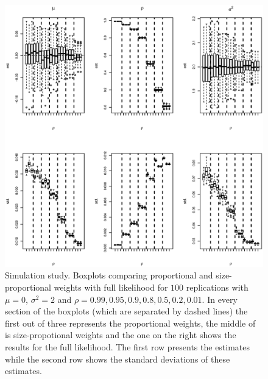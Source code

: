 \documentclass[11pt,a5paper,twoside]{book}
\begin{document}
{\begin{figure}[ht!]
\centering
\includegraphics[angle=270]{comp_rho.eps}
\caption[Simulation study. Boxplots comparing proportional and size-proportional weights with full likelihood for $100$ replications with $\mu=0$, $\sigma^2=2$ and $\rho=0.99,0.95,0.9,0.8,0.5,0.2,0.01$]{Simulation study. Boxplots comparing proportional and size-proportional weights with full likelihood for $100$ replications with $\mu=0$, $\sigma^2=2$ and $\rho=0.99,0.95,0.9,0.8,0.5,0.2,0.01$. In every section of the boxplots (which are separated by dashed lines) the first out of three represents the proportional weights, the middle of is size-propotional weights and the one on the right shows the results for the full likelihood. The first row presents the estimates while the second row shows the standard deviations of these estimates.} \label{fig_rho1b}
\end{figure}
\begin{figure}[ht!]
\centering

\end{figure}}
\end{document}
